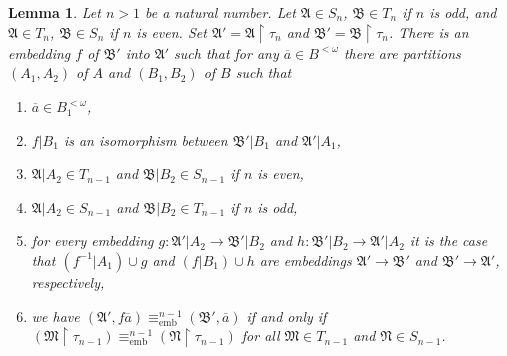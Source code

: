 \documentclass{ndjflart}
\theoremstyle{plain}
\newtheorem{lemma}[conjecture]{Lemma}
\theoremstyle{definition}
\numberwithin{equation}{section}
\DeclareMathOperator{\emb}{emb}
\begin{document}
\begin{lemma}\label{structure}
Let $n>1$ be a natural number. 
Let $\mathfrak{A} \in S_n$, $\mathfrak{B}\in T_n$ if $n$ is odd, and
$\mathfrak{A}\in T_n$, $\mathfrak{B} \in S_n$ if $n$ is even.
Set $\mathfrak{A}' = \mathfrak{A}\upharpoonright \tau_n$ and $\mathfrak{B}' = \mathfrak{B}\upharpoonright \tau_n$.
There is an embedding $f$ of $\mathfrak{B}'$ into $\mathfrak{A}'$ such that for any $\overline{a} \in B^{<\omega}$ there are partitions $(A_1,A_2)$ of $A$ and $(B_1,B_2)$ of $B$ such that
\begin{enumerate}
\item $\overline{a} \in B_1^{<\omega}$,
\item $f | B_1$ is an isomorphism between $\mathfrak{B}' | B_1$ and $\mathfrak{A}' | A_1$,
\item $\mathfrak{A}|A_2 \in T_{n-1}$ and $\mathfrak{B}|B_2 \in S_{n-1}$ if $n$ is even,
\item $\mathfrak{A}|A_2 \in S_{n-1}$ and $\mathfrak{B}|B_2 \in T_{n-1}$ if $n$ is odd,
\item for every embedding $g \colon \mathfrak{A}'|A_2\rightarrow \mathfrak{B}'|B_2$ and $h \colon \mathfrak{B}' |B_2\rightarrow \mathfrak{A}'|A_2$ it is the case that $(f^{-1}|A_1) \cup g$ and $(f|B_1) \cup h$ are embeddings $\mathfrak{A}'\rightarrow\mathfrak{B}'$ and $\mathfrak{B}'\rightarrow\mathfrak{A}'$, respectively,
\item we have $(\mathfrak{A}',f\overline{a}) \equiv^{n-1}_{\emb} (\mathfrak{B}',\overline{a})$ if and only if $(\mathfrak{M}\upharpoonright\tau_{n-1}) \equiv^{n-1}_{\emb} (\mathfrak{N}\upharpoonright \tau_{n-1})$ for all $\mathfrak{M} \in T_{n-1}$ and $\mathfrak{N} \in S_{n-1}$.
\end{enumerate}
\end{lemma}
\end{document}
